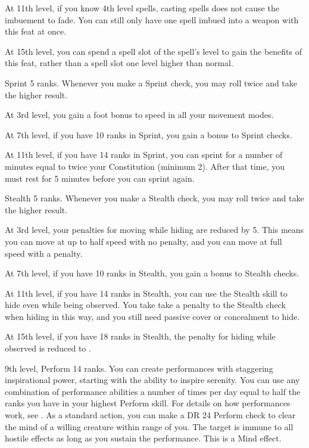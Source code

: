     At 11th level, if you know 4th level spells, casting spells does not cause the imbuement to fade.
    You can still only have one spell imbued into a weapon with this feat at once.

    At 15th level, you can spend a spell slot of the spell's level to gain the benefits of this feat, rather than a spell slot one level higher than normal.

    \featpre Sprint 5 ranks.
    \featben Whenever you make a Sprint check, you may roll twice and take the higher result.

    At 3rd level, you gain a  foot bonus to speed in all your movement modes.

    At 7th level, if you have 10 ranks in Sprint, you gain a  bonus to Sprint checks.

    At 11th level, if you have 14 ranks in Sprint, you can sprint for a number of minutes equal to twice your Constitution (minimum 2).
    After that time, you must rest for 5 minutes before you can sprint again.

    \featpre Stealth 5 ranks.
    \featben Whenever you make a Stealth check, you may roll twice and take the higher result.

    At 3rd level, your penalties for moving while hiding are reduced by 5.
    This means you can move at up to half speed with no penalty, and you can move at full speed with a  penalty.

    At 7th level, if you have 10 ranks in Stealth, you gain a  bonus to Stealth checks.

    At 11th level, if you have 14 ranks in Stealth, you can use the Stealth skill to hide even while being observed.
    You take take a  penalty to the Stealth check when hiding in this way, and you still need passive cover or concealment to hide.

    At 15th level, if you have 18 ranks in Stealth, the penalty for hiding while observed is reduced to .

    \featpres 9th level, Perform 14 ranks.
    \featben You can create performances with staggering inspirational power, starting with the ability to inspire serenity.
    You can use any combination of performance abilities a number of times per day equal to half the ranks you have in your highest Perform skill.
    For details on how performances work, see .
     As a standard action, you can make a DR 24 Perform check to clear the mind of a willing creature within \rngmed range of you.
    The target is immune to all hostile  effects as long as you sustain the performance.
    This is a Mind effect.

